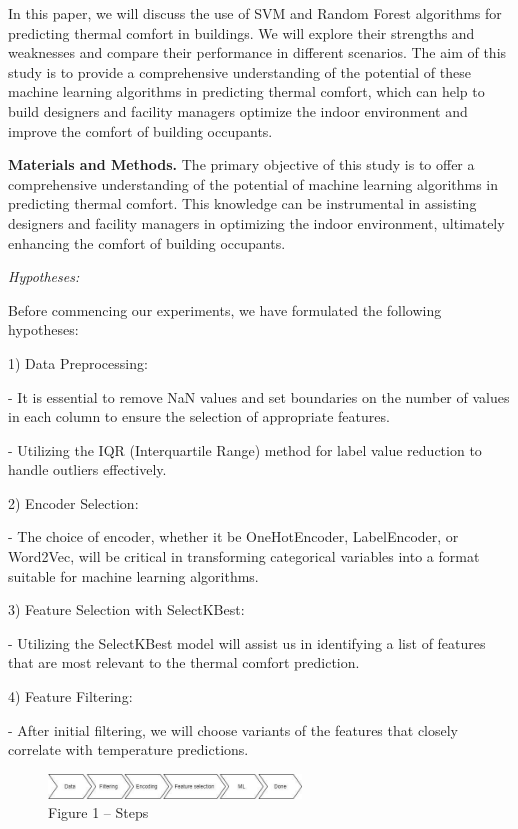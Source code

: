 \begin{multicols}{2}
In this paper, we will discuss the use of SVM and Random Forest
algorithms for predicting thermal comfort in buildings. We will explore
their strengths and weaknesses and compare their performance in
different scenarios. The aim of this study is to provide a comprehensive
understanding of the potential of these machine learning algorithms in
predicting thermal comfort, which can help to build designers and
facility managers optimize the indoor environment and improve the
comfort of building occupants.

{\bfseries Materials and Methods.} The primary objective of this study is
to offer a comprehensive understanding of the potential of machine
learning algorithms in predicting thermal comfort. This knowledge can be
instrumental in assisting designers and facility managers in optimizing
the indoor environment, ultimately enhancing the comfort of building
occupants.

\emph{Hypotheses:}

Before commencing our experiments, we have formulated the following
hypotheses:

1) Data Preprocessing:

- It is essential to remove NaN values and set boundaries on the number
of values in each column to ensure the selection of appropriate
features.

- Utilizing the IQR (Interquartile Range) method for label value
reduction to handle outliers effectively.

2) Encoder Selection:

- The choice of encoder, whether it be OneHotEncoder, LabelEncoder, or
Word2Vec, will be critical in transforming categorical variables into a
format suitable for machine learning algorithms.

3) Feature Selection with SelectKBest:

- Utilizing the SelectKBest model will assist us in identifying a list
of features that are most relevant to the thermal comfort prediction.

4) Feature Filtering:

- After initial filtering, we will choose variants of the features that
closely correlate with temperature predictions.
\end{multicols}

\begin{figure}[H]
	\centering
	\includegraphics[width=0.6\textwidth]{media/ict/image17}
	\caption*{Figure 1 -- Steps}
\end{figure}

